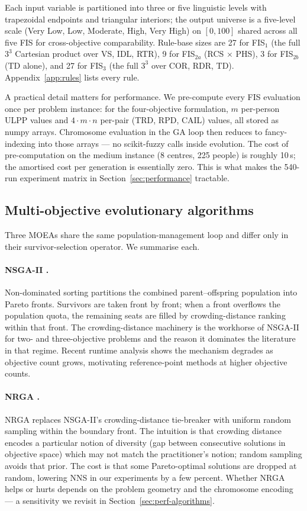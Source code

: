 \documentclass[applsci,article,submit,moreauthors,pdftex]{Definitions/mdpi}
\begin{document}
Each input variable is partitioned into three or five linguistic levels with
trapezoidal endpoints and triangular interiors; the output universe is a
five-level scale (Very Low, Low, Moderate, High, Very High) on $[0, 100]$
shared across all five FIS for cross-objective comparability. Rule-base sizes
are 27 for FIS$_1$ (the full $3^3$ Cartesian product over VS, IDL, RTR),
9 for FIS$_{2a}$ (RCS $\times$ PHS), 3 for FIS$_{2b}$ (TD alone), and 27 for
FIS$_3$ (the full $3^3$ over COR, RDR, TD). Appendix~\ref{app:rules} lists
every rule.

A practical detail matters for performance. We pre-compute every FIS
evaluation once per problem instance: for the four-objective formulation,
$m$ per-person ULPP values and $4 \cdot m \cdot n$ per-pair (TRD, RPD,
CAIL) values, all stored as numpy arrays. Chromosome evaluation in the GA
loop then reduces to fancy-indexing into those arrays --- no scikit-fuzzy
\cite{mamdani1975} calls inside evolution. The cost of pre-computation
on the medium instance (8 centres, 225 people) is roughly 10\,s; the
amortised cost per generation is essentially zero. This is what makes the
540-run experiment matrix in Section~\ref{sec:performance} tractable.

\subsection{Multi-objective evolutionary algorithms}\label{sec:algo-moea}

Three MOEAs share the same population-management loop and differ only in
their survivor-selection operator. We summarise each.

\paragraph{NSGA-II \cite{deb2002}.}
Non-dominated sorting partitions the combined parent--offspring population
into Pareto fronts. Survivors are taken front by front; when a front
overflows the population quota, the remaining seats are filled by
crowding-distance ranking within that front. The crowding-distance
machinery is the workhorse of NSGA-II for two- and three-objective problems
and the reason it dominates the literature in that regime. Recent runtime
analysis \cite{zheng2024nsga2} shows the mechanism degrades as objective
count grows, motivating reference-point methods at higher objective counts.

\paragraph{NRGA \cite{omar2008nrga}.}
NRGA replaces NSGA-II's crowding-distance tie-breaker with uniform random
sampling within the boundary front. The intuition is that crowding distance
encodes a particular notion of diversity (gap between consecutive
solutions in objective space) which may not match the practitioner's notion;
random sampling avoids that prior. The cost is that some Pareto-optimal
solutions are dropped at random, lowering NNS in our experiments by a few
percent. Whether NRGA helps or hurts depends on the problem geometry and the
chromosome encoding --- a sensitivity we revisit in
Section~\ref{sec:perf-algorithms}.
\end{document}
